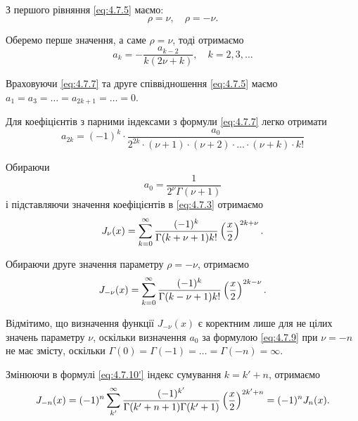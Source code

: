 З першого рівняння \eqref{eq:4.7.5} маємо:
\begin{equation}
	\label{eq:4.7.6}
	\rho = \nu, \quad \rho = - \nu.
\end{equation}

Оберемо перше значення, а саме $\rho = \nu$, тоді отримаємо
\begin{equation}
	\label{eq:4.7.7}
	a_k = - \frac{a_{k - 2}}{k (2 \nu + k)}, \quad k = 2, 3, \ldots
\end{equation}

Враховуючи \eqref{eq:4.7.7} та друге співвідношення \eqref{eq:4.7.5} маємо $a_1 = a_3 = \ldots = a_{2k + 1} = \ldots = 0$. \medskip

Для коефіцієнтів з парними індексами з формули \eqref{eq:4.7.7} легко отримати 
\begin{equation}
	\label{eq:4.7.8}
	a_{2k} = (-1)^k \cdot \frac{a_0}{2^{2k} \cdot (\nu + 1) \cdot (\nu + 2) \cdot \ldots \cdot (\nu + k) \cdot k!}
\end{equation}

Обираючи
\begin{equation}
	\label{eq:4.7.9}
	a_0 = \frac{1}{2^\nu \Gamma(\nu + 1)}
\end{equation}
і підставляючи значення коефіцієнтів в \eqref{eq:4.7.3} отримаємо 
\begin{equation}
	\label{eq:4.7.10}
	J_\nu(x) = \displaystyle\sum\limits_{k = 0}^\infty \frac{(-1)^k}{\Gamma(k + \nu + 1) k!} \left(\frac{x}{2}\right)^{2k + \nu}.
\end{equation}

Обираючи друге значення параметру $\rho = - \nu$, отримаємо 
\begin{equation}
	\label{eq:4.7.10'}
	J_{-\nu}(x) = \displaystyle\sum\limits_{k = 0}^\infty \frac{(-1)^k}{\Gamma(k - \nu + 1) k!} \left(\frac{x}{2}\right)^{2k - \nu}.
\end{equation}

Відмітимо, що визначення функції $J_{-\nu}(x)$ є коректним лише для не цілих значень параметру $\nu$, оскільки визначення $a_0$ за формулою \eqref{eq:4.7.9} при $\nu = - n$ не має змісту, оскільки $\Gamma(0) = \Gamma(-1) = \ldots = \Gamma(-n) = \infty$. \medskip

Змінюючи в формулі \eqref{eq:4.7.10'} індекс сумування $k = k' + n$, отримаємо
\begin{equation}
	\label{eq:4.7.11}
	J_{-n}(x) = (-1)^n \displaystyle\sum\limits_{k'}^\infty \frac{(-1)^{k'}}{\Gamma(k'+n+1)\Gamma(k'+1)} \left(\frac{x}{2}\right)^{2k'+n}=(-1)^n J_n(x).
\end{equation}

